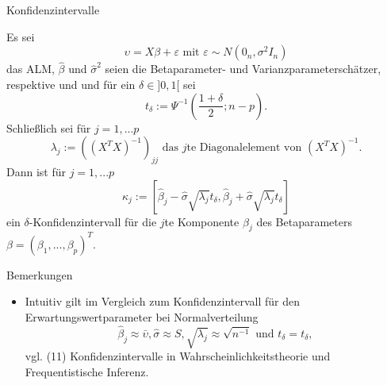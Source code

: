 \documentclass[
  8pt,
  ignorenonframetext,
]{beamer}
\providecommand{\tightlist}{%
  \setlength{\itemsep}{0pt}\setlength{\parskip}{0pt}}
\begin{document}
\begin{frame}{Konfidenzintervalle}
\protect\hypertarget{konfidenzintervalle}{}
\footnotesize
\begin{theorem}
\justifying
\normalfont
Es sei
\begin{equation}
\upsilon = X\beta + \varepsilon \mbox{ mit } \varepsilon \sim N(0_n,\sigma^2I_n)
\end{equation}
das ALM,  $\hat{\beta}$ und $\hat{\sigma}^2$ seien die Betaparameter- und Varianzparameterschätzer,
respektive und und für ein $\delta \in ]0,1[$ sei 
\begin{equation}
t_\delta := \Psi^{-1}\left(\frac{1+\delta}{2}; n - p \right).
\end{equation}
Schließlich sei für $j = 1,...p$
\begin{equation}
\lambda_j := \left(\left(X^TX \right)^{-1}\right)_{jj}
\mbox{ das $j$te Diagonalelement von } \left(X^TX \right)^{-1}. 
\end{equation}
Dann ist für $j = 1,...p$
\begin{equation}
\kappa_j := \left[\hat{\beta}_j - \hat{\sigma}\sqrt{\lambda_j}t_{\delta},\hat{\beta}_j + \hat{\sigma}\sqrt{\lambda_j}t_{\delta}\right]
\end{equation}
ein $\delta$-Konfidenzintervall für die $j$te Komponente $\beta_j$ des Betaparameters $\beta = (\beta_1,...,\beta_p)^T$.
\end{theorem}

Bemerkungen

\begin{itemize}
\tightlist
\item
  Intuitiv gilt im Vergleich zum Konfidenzintervall für den
  Erwartungswertparameter bei Normalverteilung \begin{equation}
  \hat{\beta}_j \approx \bar{\upsilon}, \hat{\sigma} \approx S, \sqrt{\lambda_j} \approx \sqrt{n^{-1}} \mbox{ und } t_\delta = t_\delta,
  \end{equation} vgl. (11) Konfidenzintervalle in
  Wahrscheinlichkeitstheorie und Frequentistische Inferenz.
\end{itemize}
\end{frame}
\end{document}
